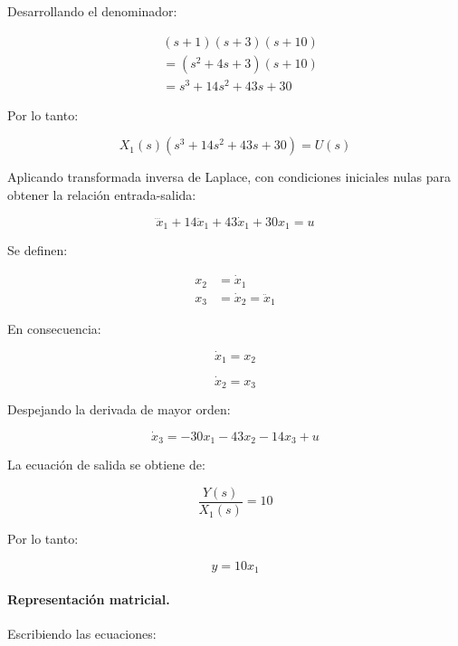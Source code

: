 \documentclass[12pt,a4paper]{article}
\begin{document}
Desarrollando el denominador:

\begin{align}&(s+1)(s+3)(s+10)\\&=(s^2+4s+3)(s+10)\\&=s^3+14s^2+43s+30\end{align}

Por lo tanto:

\begin{equation}X_1(s)(s^3+14s^2+43s+30)=U(s)\end{equation}

Aplicando transformada inversa de Laplace, con condiciones iniciales nulas para obtener la relación entrada-salida:

\begin{equation}\dddot{x}_1+14\ddot{x}_1+43\dot{x}_1+30x_1=u\end{equation}

Se definen:

\begin{align}x_2&=\dot{x}_1\\x_3&=\dot{x}_2=\ddot{x}_1\end{align}

En consecuencia:

\begin{equation}\dot{x}_1=x_2\end{equation}

\begin{equation}\dot{x}_2=x_3\end{equation}

Despejando la derivada de mayor orden:

\begin{equation}\dot{x}_3=-30x_1-43x_2-14x_3+u\end{equation}

La ecuación de salida se obtiene de:

\begin{equation}\frac{Y(s)}{X_1(s)}=10\end{equation}

Por lo tanto:

\begin{equation}y=10x_1\end{equation}
\paragraph{Representación matricial.} Escribiendo las ecuaciones:
\end{document}
